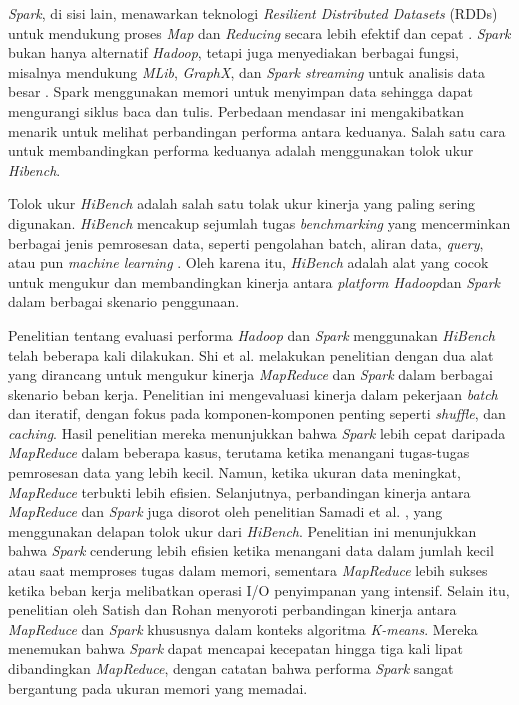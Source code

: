 \textit{Spark}, di sisi lain, menawarkan teknologi \textit{Resilient Distributed Datasets} (RDDs) untuk mendukung proses \textit{Map} dan \textit{Reducing} secara lebih efektif dan cepat \cite{ahmadvandGapproxUsingGallup2019}. \textit{Spark} bukan hanya alternatif \textit{Hadoop}, tetapi juga menyediakan berbagai fungsi, misalnya mendukung \textit{MLib}, \textit{GraphX}, dan \textit{Spark streaming }untuk analisis data besar \cite{zahariaSparkClusterComputing2010}. Spark menggunakan memori untuk menyimpan data sehingga dapat mengurangi siklus baca dan tulis. Perbedaan mendasar ini mengakibatkan menarik untuk melihat perbandingan performa antara keduanya. Salah satu cara untuk membandingkan performa keduanya adalah menggunakan tolok ukur \textit{Hibench}.

Tolok ukur \textit{HiBench} adalah salah satu tolak ukur kinerja yang paling sering digunakan. \textit{HiBench} mencakup sejumlah tugas \textit{benchmarking} yang mencerminkan berbagai jenis pemrosesan data, seperti pengolahan batch, aliran data, \textit{query}, atau pun \textit{machine learning} \cite{huangHiBenchBenchmarkSuite}. Oleh karena itu, \textit{HiBench} adalah alat yang cocok untuk mengukur dan membandingkan kinerja antara \textit{platform Hadoop}dan \textit{Spark} dalam berbagai skenario penggunaan.

Penelitian tentang evaluasi performa \textit{Hadoop} dan \textit{Spark} menggunakan \textit{HiBench} telah beberapa kali dilakukan. Shi et al. \cite{shiClashTitansMapReduce2015} melakukan penelitian dengan dua alat yang dirancang untuk mengukur kinerja \textit{MapReduce} dan \textit{Spark} dalam berbagai skenario beban kerja. Penelitian ini mengevaluasi kinerja dalam pekerjaan \textit{batch} dan iteratif, dengan fokus pada komponen-komponen penting seperti \textit{shuffle}, dan \textit{caching}. Hasil penelitian mereka menunjukkan bahwa \textit{Spark} lebih cepat daripada \textit{MapReduce} dalam beberapa kasus, terutama ketika menangani tugas-tugas pemrosesan data yang lebih kecil. Namun, ketika ukuran data meningkat, \textit{MapReduce} terbukti lebih efisien. Selanjutnya, perbandingan kinerja antara \textit{MapReduce} dan \textit{Spark} juga disorot oleh penelitian Samadi et al. \cite{samadiComparativeStudyHadoop2016}, yang menggunakan delapan tolok ukur dari \textit{HiBench}. Penelitian ini menunjukkan bahwa \textit{Spark} cenderung lebih efisien ketika menangani data dalam jumlah kecil atau saat memproses tugas dalam memori, sementara \textit{MapReduce} lebih sukses ketika beban kerja melibatkan operasi I/O penyimpanan yang intensif. Selain itu, penelitian oleh Satish dan Rohan \cite{gopalaniComparingApacheSpark2015} menyoroti perbandingan kinerja antara \textit{MapReduce} dan \textit{Spark} khususnya dalam konteks algoritma \textit{K-means}. Mereka menemukan bahwa \textit{Spark} dapat mencapai kecepatan hingga tiga kali lipat dibandingkan \textit{MapReduce}, dengan catatan bahwa performa \textit{Spark} sangat bergantung pada ukuran memori yang memadai.

